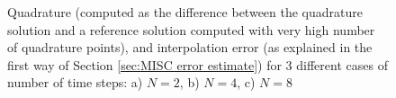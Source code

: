 \documentclass[11pt]{article}
\begin{document}
\begin{figure}
\begin{subfigure}{0.6\textwidth}
		\caption{}
		\label{fig:3}
	\end{subfigure}
	\caption{Quadrature (computed as the difference between the quadrature solution and a reference solution computed with very high number of quadrature points),   and interpolation error  (as explained in the first way of Section \ref{sec:MISC error estimate}) for $3$ different cases of number of time steps: a) $N=2$, b) $N=4$,  c) $N=8$}
	\label{fig:Quadrature and interpolation error estimation for 3 different cases of number of time steps}
\end{figure}
\FloatBarrier





 








 

 

 
 
 
\end{document}
